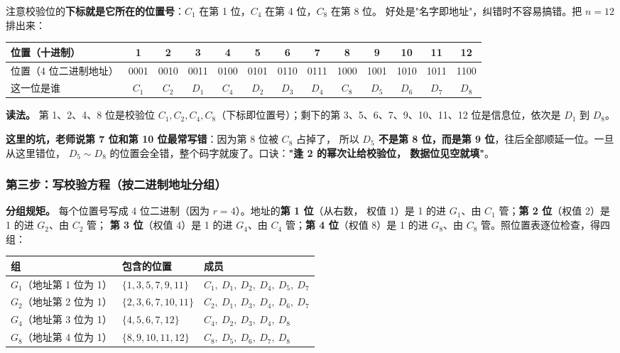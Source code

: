 注意校验位的\textbf{下标就是它所在的位置号}：$C_1$ 在第 1 位，$C_4$ 在第 4 位，$C_8$ 在第 8 位。
好处是"名字即地址"，纠错时不容易搞错。把 $n=12$ 排出来：

\begin{center}\small
\setlength{\tabcolsep}{4pt}
\begin{tabular}{@{}l*{12}{c}@{}}
\toprule
位置（十进制） & 1&2&3&4&5&6&7&8&9&10&11&12\\
\midrule
位置（4 位二进制地址） & 0001&0010&0011&0100&0101&0110&0111&1000&1001&1010&1011&1100\\
\midrule
这一位是谁 & $C_1$&$C_2$&$D_1$&$C_4$&$D_2$&$D_3$&$D_4$&$C_8$&$D_5$&$D_6$&$D_7$&$D_8$\\
\bottomrule
\end{tabular}
\end{center}

\textbf{读法。} 第 1、2、4、8 位是校验位 $C_1,C_2,C_4,C_8$（下标即位置号）；剩下的第
3、5、6、7、9、10、11、12 位是信息位，依次是 $D_1$ 到 $D_8$。

\textbf{这里的坑，老师说第 7 位和第 10 位最常写错}：因为第 8 位被 $C_8$ 占掉了，
所以 \textbf{$D_5$ 不是第 8 位，而是第 9 位}，往后全部顺延一位。一旦从这里错位，
$D_5\sim D_8$ 的位置会全错，整个码字就废了。口诀：\textbf{"逢 2 的幂次让给校验位，
数据位见空就填"}。

\subsubsection{第三步：写校验方程（按二进制地址分组）}

\textbf{分组规矩。} 每个位置号写成 4 位二进制（因为 $r=4$）。地址的\textbf{第 1 位}（从右数，
权值 1）是 1 的进 $G_1$、由 $C_1$ 管；\textbf{第 2 位}（权值 2）是 1 的进 $G_2$、由 $C_2$ 管；
\textbf{第 3 位}（权值 4）是 1 的进 $G_4$、由 $C_4$ 管；\textbf{第 4 位}（权值 8）是 1 的进
$G_8$、由 $C_8$ 管。照位置表逐位检查，得四组：

\begin{center}\small
\setlength{\tabcolsep}{4pt}
\begin{tabular}{@{}lll@{}}
\toprule
组 & 包含的位置 & 成员\\
\midrule
$G_1$（地址第 1 位为 1） & $\{1,3,5,7,9,11\}$ & $C_1,\ D_1,\ D_2,\ D_4,\ D_5,\ D_7$\\
$G_2$（地址第 2 位为 1） & $\{2,3,6,7,10,11\}$ & $C_2,\ D_1,\ D_3,\ D_4,\ D_6,\ D_7$\\
$G_4$（地址第 3 位为 1） & $\{4,5,6,7,12\}$ & $C_4,\ D_2,\ D_3,\ D_4,\ D_8$\\
$G_8$（地址第 4 位为 1） & $\{8,9,10,11,12\}$ & $C_8,\ D_5,\ D_6,\ D_7,\ D_8$\\
\bottomrule
\end{tabular}
\end{center}

